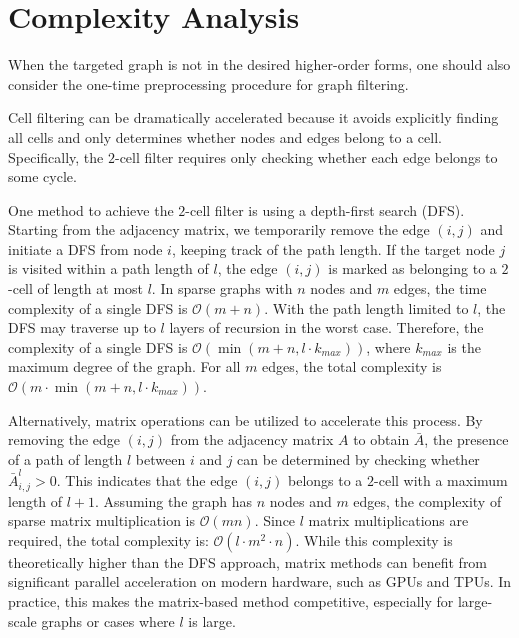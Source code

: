 




\section{Complexity Analysis}
\label{app:complexity}



When the targeted graph is not in the desired higher-order forms, one should also consider the one-time preprocessing procedure for graph filtering.

Cell filtering can be dramatically accelerated because it avoids explicitly finding all cells and only determines whether nodes and edges belong to a cell. Specifically, the $2$-cell filter requires only checking whether each edge belongs to some cycle.

One method to achieve the $2$-cell filter is using a depth-first search (DFS). Starting from the adjacency matrix, we temporarily remove the edge $(i, j)$ and initiate a DFS from node $i$, keeping track of the path length. If the target node $j$ is visited within a path length of $l$, the edge $(i, j)$ is marked as belonging to a $2$-cell of length at most $l$. In sparse graphs with $n$ nodes and $m$ edges, the time complexity of a single DFS is $\mathcal{O}(m + n)$. With the path length limited to $l$, the DFS may traverse up to $l$ layers of recursion in the worst case. Therefore, the complexity of a single DFS is $\mathcal{O}(\min(m + n, l \cdot k_{max})) $, where $k_{max}$ is the maximum degree of the graph. For all $m$ edges, the total complexity is
$\mathcal{O}\left(m \cdot \min(m + n, l \cdot k_{max})\right)$.




Alternatively, matrix operations can be utilized to accelerate this process. By removing the edge $(i, j)$ from the adjacency matrix $A$ to obtain $\bar{A}$, the presence of a path of length $l$ between $i$ and $j$ can be determined by checking whether $\bar{A}^l_{i,j} > 0$. This indicates that the edge $(i, j)$ belongs to a $2$-cell with a maximum length of $l+1$. Assuming the graph has $n$ nodes and $m$ edges, the complexity of sparse matrix multiplication is $\mathcal{O}(mn)$. Since $l$ matrix multiplications are required, the total complexity is: $\mathcal{O}(l \cdot m^2 \cdot n)$. While this complexity is theoretically higher than the DFS approach, matrix methods can benefit from significant parallel acceleration on modern hardware, such as GPUs and TPUs. In practice, this makes the matrix-based method competitive, especially for large-scale graphs or cases where $l$ is large.



